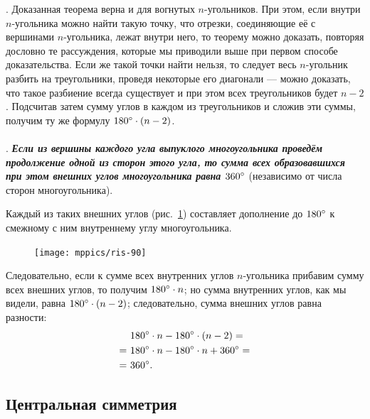 \documentclass[oneside]{book}
\begin{document}
\medskip

\smallskip
{}.
Доказанная теорема верна и для вогнутых $n$-угольников.
При этом, если внутри $n$-угольника можно найти такую точку, что отрезки, соединяющие её с вершинами $n$-угольника, лежат внутри него, то теорему можно доказать, повторяя дословно те рассуждения, которые мы приводили выше при первом способе доказательства.
Если же такой точки найти нельзя, то следует весь $n$-угольник разбить на треугольники, проведя некоторые его диагонали — можно доказать, что такое разбиение всегда существует и при этом всех треугольников будет $n-2$.
Подсчитав затем сумму углов в каждом из треугольников и сложив эти суммы, получим ту же формулу $180\degree\cdot(n - 2)$.

\paragraph{}\label{1938/83}
\mbox{.}
\textbf{\emph{Если из вершины каждого угла выпуклого многоугольника проведём продолжение одной из сторон этого угла, то сумма всех образовавшихся при этом внешних углов многоугольника равна $360\degree$}} (независимо от числа сторон многоугольника).

Каждый из таких внешних углов (рис.~\ref{1938/ris-90}) составляет дополнение до $180\degree$ к смежному с ним внутреннему углу многоугольника.

{

\begin{figure}
\centering
\texttt{[image: mppics/ris-90]}
\caption{}\label{1938/ris-90}
\end{figure}

Следовательно, если к сумме всех внутренних углов $n$-угольника прибавим сумму всех внешних углов, то получим $180\degree\cdot n$;
но сумма внутренних углов, как мы видели, равна $180\degree\cdot (n - 2)$;
следовательно, сумма внешних углов равна разности:
\begin{align*}
&180\degree\cdot n-180\degree\cdot (n - 2)=
\\
=~&180\degree\cdot n-180\degree\cdot n+360\degree=
\\
=~&360\degree.
\end{align*}

}

\subsection*{Центральная симметрия}
\end{document}
